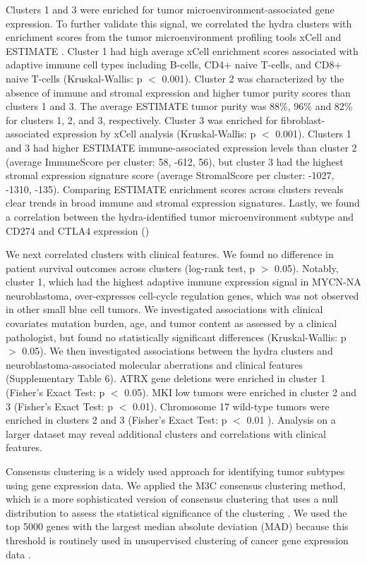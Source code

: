 \documentclass[10pt,letterpaper]{article}
\begin{document}
Clusters 1 and 3 were enriched for tumor microenvironment-associated gene expression. To further validate this signal, we correlated the hydra clusters with enrichment scores from the tumor microenvironment profiling tools xCell \cite{aranXCellDigitallyPortraying2017} and ESTIMATE \cite{yoshiharaInferringTumourPurity2013a}. Cluster 1 had high average xCell enrichment scores associated with adaptive immune cell types including B-cells, CD4+ naive T-cells, and CD8+ naive T-cells (Kruskal-Wallis: p $<$ 0.001). Cluster 2 was characterized by the absence of immune and stromal expression and higher tumor purity scores than clusters 1 and 3. The average ESTIMATE tumor purity was 88\%, 96\% and 82\% for clusters 1, 2, and 3, respectively. Cluster 3 was enriched for fibroblast-associated expression by xCell analysis (Kruskal-Wallis: p $<$ 0.001). Clusters 1 and 3 had higher ESTIMATE immune-associated expression levels than cluster 2 (average ImmuneScore per cluster: 58, -612, 56), but cluster 3 had the highest stromal expression signature score (average StromalScore per cluster: -1027, -1310, -135). Comparing ESTIMATE enrichment scores across clusters reveals clear trends in broad immune and stromal expression signatures. Lastly, we found a correlation between the hydra-identified tumor microenvironment subtype and CD274 and CTLA4 expression ()

We next correlated clusters with clinical features. We found no difference in patient survival outcomes across clusters (log-rank test, p $>$ 0.05). Notably, cluster 1, which had the highest adaptive immune expression signal in MYCN-NA neuroblastoma, over-expresses cell-cycle regulation genes, which was not observed in other small blue cell tumors. We investigated associations with clinical covariates mutation burden, age, and tumor content as assessed by a clinical pathologist, but found no statistically significant differences (Kruskal-Wallis: p $>$ 0.05). We then investigated associations between the hydra clusters and neuroblastoma-associated molecular aberrations and clinical features (Supplementary Table 6). ATRX gene deletions were enriched in cluster 1 (Fisher’s Exact Test: p $<$ 0.05). MKI low tumors were enriched in cluster 2 and 3 (Fisher’s Exact Test: p $<$ 0.01). Chromosome 17 wild-type tumors were enriched in clusters 2 and 3 (Fisher’s Exact Test: p $<$ 0.01 ). Analysis on a larger dataset may reveal additional clusters and correlations with clinical features.

Consensus clustering is a widely used approach for identifying tumor subtypes using gene expression data. We applied the M3C consensus clustering method, which is a more sophisticated version of consensus clustering that uses a null distribution to assess the statistical significance of the clustering \cite{johnM3CMonteCarlo2018, wilkersonConsensusClusterPlusClassDiscovery2010a}. We used the top 5000 genes with the largest median absolute deviation (MAD) because this threshold is routinely used in unsupervised clustering of cancer gene expression data \cite{bourgonIndependentFilteringIncreases2010, tritchlerFilteringGenesCluster2009, carcamo-oriveAnalysisTranscriptionalVariability2017}.
\end{document}
